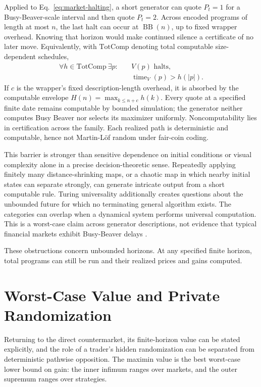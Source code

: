 \documentclass[aps,pra,reprint,superscriptaddress,amsmath,amssymb,floatfix]{revtex4-2}
\theoremstyle{plain}
\theoremstyle{definition}
\theoremstyle{remark}
\begin{document}
Applied to Eq.~\eqref{eq:market-halting}, a short generator can quote
\(P_t=1\) for a Busy-Beaver-scale interval and then quote \(P_t=2\). Across
encoded programs of length at most \(n\), the last halt can occur at
\(\operatorname{BB}(n)\), up to fixed wrapper overhead. Knowing that horizon
would make continued silence a certificate of no later move. Equivalently,
with \(\mathrm{TotComp}\) denoting total computable size-dependent schedules,
\begin{equation}
  \begin{aligned}
  \forall h\in\mathrm{TotComp}\ \exists p:\quad
    &V(p)\text{ halts},\\
    &\operatorname{time}_V(p)>h(|p|).
  \end{aligned}
  \label{eq:bb-horizon}
\end{equation}
If \(c\) is the wrapper's fixed description-length overhead, it is absorbed by
the computable envelope \(H(n)=\max_{k\leq n+c}h(k)\). Every quote at a
specified finite date remains
computable by bounded simulation; the generator neither computes Busy Beaver
nor selects its maximizer uniformly. Noncomputability lies in certification
across the family. Each realized path is deterministic and computable, hence
not Martin-L\"of random under fair-coin coding.

This barrier is stronger than sensitive dependence on initial conditions or
visual complexity alone in a precise decision-theoretic sense. Repeatedly
applying finitely many distance-shrinking maps, or a chaotic map in which
nearby initial states can separate strongly, can generate intricate output
from a short computable rule. Turing universality additionally creates questions about
the unbounded future for which no terminating general algorithm exists. The
categories can overlap when a dynamical system performs universal computation.
This is a worst-case claim across generator descriptions, not evidence that
typical financial markets exhibit Busy-Beaver delays
\cite{barnsley:88,moore,calude:037103}.

These obstructions concern unbounded horizons. At any specified finite horizon,
total programs can still be run and their realized prices and gains computed.

\section{Worst-Case Value and Private Randomization}
\label{sec:randomization}

Returning to the direct countermarket, its finite-horizon value can be stated
explicitly, and the role of a trader's hidden randomization can be separated
from deterministic pathwise opposition. The maximin value is the best
worst-case lower bound on gain: the inner infimum ranges over markets, and the
outer supremum ranges over strategies.
\end{document}
